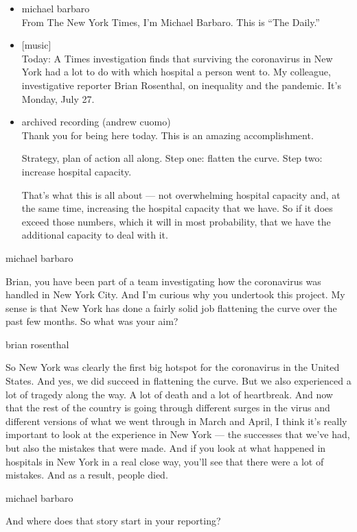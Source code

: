 \begin{itemize}
\item
  michael barbaro\\
  From The New York Times, I'm Michael Barbaro. This is ``The Daily.''
\item
  {[}music{]}\\
  Today: A Times investigation finds that surviving the coronavirus in
  New York had a lot to do with which hospital a person went to. My
  colleague, investigative reporter Brian Rosenthal, on inequality and
  the pandemic. It's Monday, July 27.
\item
  archived recording (andrew cuomo)\\
  Thank you for being here today. This is an amazing accomplishment.

  Strategy, plan of action all along. Step one: flatten the curve. Step
  two: increase hospital capacity.

  That's what this is all about --- not overwhelming hospital capacity
  and, at the same time, increasing the hospital capacity that we have.
  So if it does exceed those numbers, which it will in most probability,
  that we have the additional capacity to deal with it.
\end{itemize}

michael barbaro

Brian, you have been part of a team investigating how the coronavirus
was handled in New York City. And I'm curious why you undertook this
project. My sense is that New York has done a fairly solid job
flattening the curve over the past few months. So what was your aim?

brian rosenthal

So New York was clearly the first big hotspot for the coronavirus in the
United States. And yes, we did succeed in flattening the curve. But we
also experienced a lot of tragedy along the way. A lot of death and a
lot of heartbreak. And now that the rest of the country is going through
different surges in the virus and different versions of what we went
through in March and April, I think it's really important to look at the
experience in New York --- the successes that we've had, but also the
mistakes that were made. And if you look at what happened in hospitals
in New York in a real close way, you'll see that there were a lot of
mistakes. And as a result, people died.

michael barbaro

And where does that story start in your reporting?

